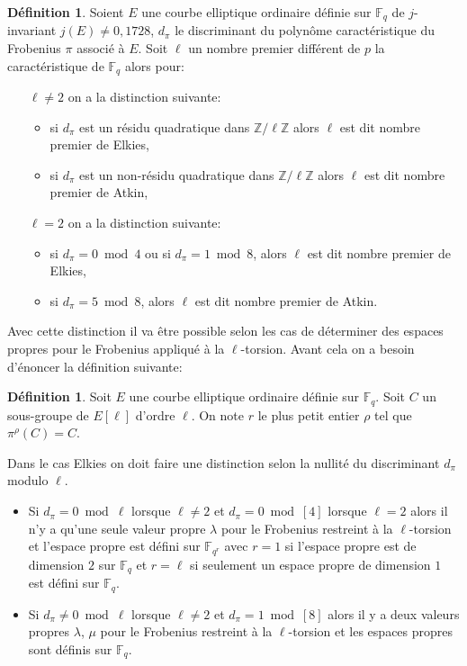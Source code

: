 \documentclass[10pt,a4paper]{book}
\theoremstyle{plain}
\theoremstyle{definition}
\theoremstyle{definition}
\theoremstyle{definition}
\theoremstyle{definition}
\newtheorem{defi}[thm]{Définition}
\theoremstyle{remark}
\theoremstyle{remark}
\theoremstyle{definition}
\begin{document}
\begin{defi}\label{def:dif-Atk-Elk}
Soient $E$ une courbe elliptique ordinaire définie sur $\mathbb{F}_q$ de $j$-invariant $j(E) \neq 0,1728$, $d_{\pi}$ le discriminant du polynôme caractéristique du Frobenius $\pi$ associé à $E$. Soit $\ell$ un nombre premier différent de $p$ la caractéristique de $\mathbb{F}_q$ alors pour:
\begin{itemize}
\item[$\ell \neq 2$] on a la distinction suivante: 

\begin{itemize}
\item si $d_{\pi}$ est un résidu quadratique dans $\mathbb{Z}/\ell \mathbb{Z}$ alors $\ell$ est dit nombre premier de Elkies,
\item si $d_{\pi}$ est un non-résidu quadratique dans $\mathbb{Z}/\ell \mathbb{Z}$ alors $\ell$ est dit nombre premier de Atkin,
\end{itemize} 

\item[$\ell=2$] on a la distinction suivante:
\begin{itemize}
\item si $d_{\pi}= 0 \bmod 4$ ou si $d_{\pi}= 1 \bmod 8$, alors $\ell$ est dit nombre premier de Elkies,
\item si $d_{\pi}= 5 \bmod 8$, alors $\ell$ est dit nombre premier de Atkin.
\end{itemize}
\end{itemize}
\end{defi}
	Avec cette distinction il va être possible selon les cas de déterminer des espaces propres pour le Frobenius appliqué à la $\ell$-torsion. Avant cela on a besoin d'énoncer la définition suivante:
\begin{defi}
Soit $E$ une courbe elliptique ordinaire définie sur $\mathbb{F}_q$. Soit $C$ un sous-groupe de $E[\ell]$ d'ordre $\ell$. On note $r$ le plus petit entier $\rho$ tel que $\pi^{\rho}(C)=C$.
\end{defi}	
	 
	Dans le cas Elkies on doit faire une distinction selon la nullité du discriminant $d_{\pi}$ modulo $\ell$. 
\begin{itemize}	
	\item Si $d_{\pi}=0 \bmod \ell$ lorsque $\ell \neq 2$ et $d_{\pi}=0 \bmod [4]$ lorsque $\ell=2$  alors il n'y a qu'une seule valeur propre $\lambda$ pour le Frobenius restreint à la $\ell$-torsion  et l'espace propre est défini sur $\mathbb{F}_{q^r}$ avec $r=1$ si l'espace propre est de dimension $2$ sur $\mathbb{F}_q$ et $r=\ell$ si seulement un espace propre de dimension $1$ est défini sur $\mathbb{F}_q$.
	\item Si $d_{\pi} \neq 0 \bmod \ell$ lorsque $\ell \neq 2$ et $d_{\pi}=1 \bmod [8]$ alors il y a deux valeurs propres $\lambda$, $\mu$ pour le Frobenius restreint à la $\ell$-torsion  et les espaces propres sont définis sur $\mathbb{F}_q$.
\end{itemize}
\end{document}

